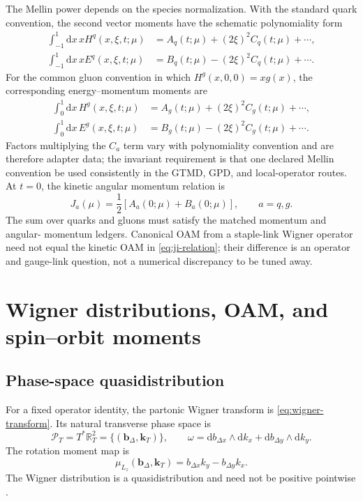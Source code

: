 \documentclass[11pt]{article}
\newcommand{\kT}{\bm{k}_{T}}
\newcommand{\bD}{\bm{b}_{\Delta}}
\newcommand{\dd}{\mathrm{d}}
\begin{document}
The Mellin power depends on the species normalization.  With the standard
quark convention, the second vector moments have the schematic polynomiality
form
\begin{align}
 \int_{-1}^{1}\dd x\,xH^q(x,\xi,t;\mu)
 &=A_q(t;\mu)+(2\xi)^2 C_q(t;\mu)+\cdots,
\label{eq:emt-h-moment}\\
 \int_{-1}^{1}\dd x\,xE^q(x,\xi,t;\mu)
 &=B_q(t;\mu)-(2\xi)^2 C_q(t;\mu)+\cdots.
\label{eq:emt-e-moment}
\end{align}
For the common gluon convention in which
\(H^g(x,0,0)=xg(x)\), the corresponding energy--momentum moments are
\begin{align}
 \int_{0}^{1}\dd x\,H^g(x,\xi,t;\mu)
 &=A_g(t;\mu)+(2\xi)^2 C_g(t;\mu)+\cdots,
\label{eq:emt-gluon-h-moment}\\
 \int_{0}^{1}\dd x\,E^g(x,\xi,t;\mu)
 &=B_g(t;\mu)-(2\xi)^2 C_g(t;\mu)+\cdots.
\label{eq:emt-gluon-e-moment}
\end{align}
Factors multiplying the \(C_a\) term vary with polynomiality convention and
are therefore adapter data; the invariant requirement is that one declared
Mellin convention be used consistently in the GTMD, GPD, and local-operator
routes.  At \(t=0\), the kinetic angular momentum relation is \cite{Ji1997}
\begin{equation}
 J_a(\mu)=\frac12\left[A_a(0;\mu)+B_a(0;\mu)\right],
 \qquad a=q,g.
\label{eq:ji-relation}
\end{equation}
The sum over quarks and gluons must satisfy the matched momentum and angular-
momentum ledgers.  Canonical OAM from a staple-link Wigner operator need not
equal the kinetic OAM in \cref{eq:ji-relation}; their difference is an
operator and gauge-link question, not a numerical discrepancy to be tuned
away.

\section{Wigner distributions, OAM, and spin--orbit moments}
\label{sec:wigner-oam}

\subsection{Phase-space quasidistribution}

For a fixed operator identity, the partonic Wigner transform is
\cref{eq:wigner-transform}.  Its natural transverse phase space is
\begin{equation}
 \mathcal P_T=T^*\mathbb R_T^2
 =\{(\bD,\kT)\},
 \qquad
 \omega=\dd b_{\Delta x}\wedge\dd k_x
       +\dd b_{\Delta y}\wedge\dd k_y.
\label{eq:transverse-phase-space}
\end{equation}
The rotation moment map is
\begin{equation}
 \mu_{L_z}(\bD,\kT)
 =b_{\Delta x}k_y-b_{\Delta y}k_x.
\label{eq:oam-moment-map}
\end{equation}
The Wigner distribution is a quasidistribution and need not be positive
pointwise \cite{BelitskyJiYuan2004,LorcePasquini2011}.
\end{document}
